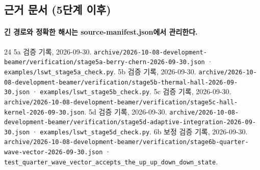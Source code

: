 \subsection{근거 문서 (5단계 이후)}\label{sources-stage5}
\begingroup%
  \framesubtitle{긴 경로와 정확한 해시는 source-manifest.json에서 관리한다.}
  \small
  \begin{thebibliography}{24}
    \setcounter{enumiv}{20}
      5a 검증 기록, 2026-09-30.
      \newblock \texttt{archive/2026-10-08-development-beamer/verification/stage5a-berry-chern-2026-09-30.json} · \texttt{examples/lswt\_stage5a\_check.py}.
      5b 검증 기록, 2026-09-30.
      \newblock \texttt{archive/2026-10-08-development-beamer/verification/stage5b-thermal-hall-2026-09-30.json} · \texttt{examples/lswt\_stage5b\_check.py}.
      5c 검증 기록, 2026-09-30.
      \newblock \texttt{archive/2026-10-08-development-beamer/verification/stage5c-hall-kernel-2026-09-30.json}.
      5d 검증 기록, 2026-09-30.
      \newblock \texttt{archive/2026-10-08-development-beamer/verification/stage5d-adaptive-integration-2026-09-30.json} · \texttt{examples/lswt\_stage5d\_check.py}.
      6b 보정 검증 기록, 2026-09-30.
      \newblock \texttt{archive/2026-10-08-development-beamer/verification/stage6b-quarter-wave-vector-2026-09-30.json} · \texttt{test\_quarter\_wave\_vector\_accepts\_the\_up\_up\_down\_down\_state}.
  \end{thebibliography}
\endgroup


